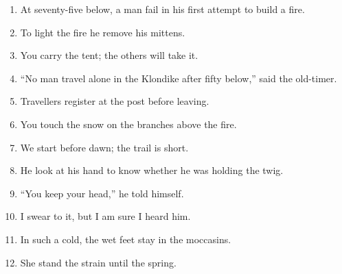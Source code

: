 \documentclass{fiche}
\begin{document}
\entete





\begin{anglais}
\begin{enumerate}[label=\arabic*.,itemsep=2.2mm,leftmargin=*]
  \item At seventy-five below, a man  fail in his first attempt to build a
    fire.
  \item To light the fire he  remove his mittens.
  \item You  carry the tent; the others will take it.
  \item ``No man  travel alone in the Klondike after fifty below,'' said the
    old-timer.
  \item Travellers  register at the post before leaving.
  \item You  touch the snow on the branches above the fire.
  \item We  start before dawn; the trail is short.
  \item He  look at his hand to know whether he was holding the twig.
  \item ``You  keep your head,'' he told himself.
  \item I  swear to it, but I am sure I heard him.
  \item In such a cold, the wet feet  stay in the moccasins.
  \item She  stand the strain until the spring.
\end{enumerate}
\end{anglais}
\end{document}
